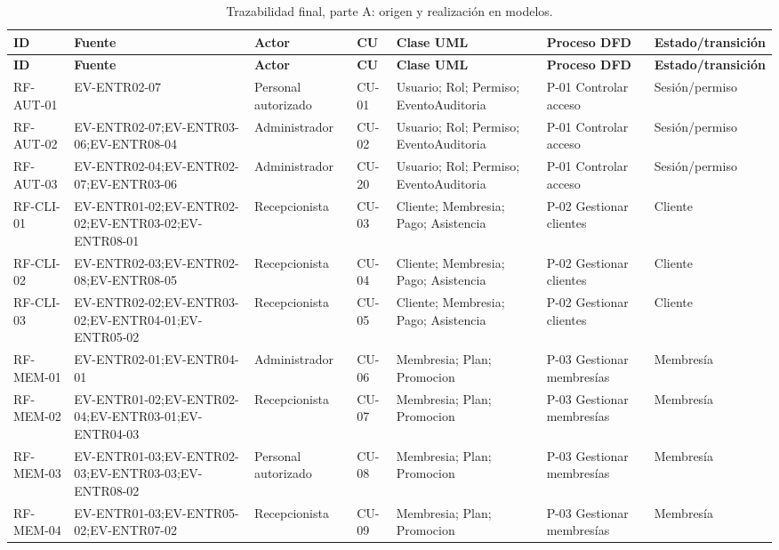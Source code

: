 \begin{landscape}
\scriptsize
\begin{longtable}{|p{1.8cm}|p{3.4cm}|p{2.0cm}|p{1.4cm}|p{5.0cm}|p{4.0cm}|p{3.2cm}|}
\caption{Trazabilidad final, parte A: origen y realización en modelos.}\\
\hline\textbf{ID} & \textbf{Fuente} & \textbf{Actor} & \textbf{CU} & \textbf{Clase UML} & \textbf{Proceso DFD} & \textbf{Estado/transición}\\\hline\endfirsthead
\hline\textbf{ID} & \textbf{Fuente} & \textbf{Actor} & \textbf{CU} & \textbf{Clase UML} & \textbf{Proceso DFD} & \textbf{Estado/transición}\\\hline\endhead
RF-AUT-01 & EV-ENTR02-07 & Personal autorizado & CU-01 & Usuario; Rol; Permiso; EventoAuditoria & P-01 Controlar acceso & Sesión/permiso \\ \hline
RF-AUT-02 & EV-ENTR02-07;EV-ENTR03-06;EV-ENTR08-04 & Administrador & CU-02 & Usuario; Rol; Permiso; EventoAuditoria & P-01 Controlar acceso & Sesión/permiso \\ \hline
RF-AUT-03 & EV-ENTR02-04;EV-ENTR02-07;EV-ENTR03-06 & Administrador & CU-20 & Usuario; Rol; Permiso; EventoAuditoria & P-01 Controlar acceso & Sesión/permiso \\ \hline
RF-CLI-01 & EV-ENTR01-02;EV-ENTR02-02;EV-ENTR03-02;EV-ENTR08-01 & Recepcionista & CU-03 & Cliente; Membresia; Pago; Asistencia & P-02 Gestionar clientes & Cliente \\ \hline
RF-CLI-02 & EV-ENTR02-03;EV-ENTR02-08;EV-ENTR08-05 & Recepcionista & CU-04 & Cliente; Membresia; Pago; Asistencia & P-02 Gestionar clientes & Cliente \\ \hline
RF-CLI-03 & EV-ENTR02-02;EV-ENTR03-02;EV-ENTR04-01;EV-ENTR05-02 & Recepcionista & CU-05 & Cliente; Membresia; Pago; Asistencia & P-02 Gestionar clientes & Cliente \\ \hline
RF-MEM-01 & EV-ENTR02-01;EV-ENTR04-01 & Administrador & CU-06 & Membresia; Plan; Promocion & P-03 Gestionar membresías & Membresía \\ \hline
RF-MEM-02 & EV-ENTR01-02;EV-ENTR02-04;EV-ENTR03-01;EV-ENTR04-03 & Recepcionista & CU-07 & Membresia; Plan; Promocion & P-03 Gestionar membresías & Membresía \\ \hline
RF-MEM-03 & EV-ENTR01-03;EV-ENTR02-03;EV-ENTR03-03;EV-ENTR08-02 & Personal autorizado & CU-08 & Membresia; Plan; Promocion & P-03 Gestionar membresías & Membresía \\ \hline
RF-MEM-04 & EV-ENTR01-03;EV-ENTR05-02;EV-ENTR07-02 & Recepcionista & CU-09 & Membresia; Plan; Promocion & P-03 Gestionar membresías & Membresía \\ \hline

\end{longtable}
\end{landscape}
